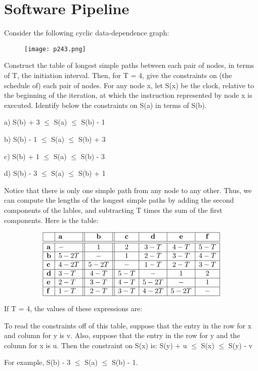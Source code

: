 \newpage
\section{Software Pipeline}





\begin{problem}

Consider the following cyclic data-dependence graph:
\begin{figure}[H]
    \centering
     \texttt{[image: p243.png]}
         \caption{}
         \label{fig:p243}
\end{figure}

Construct the table of longest simple paths between each pair of nodes, in terms of T, the initiation interval. Then, for T = 4, give the constraints on (the schedule of) each pair of nodes. For any node x, let S(x) be the clock, relative to the beginning of the iteration, at which the instruction represented by node x is executed. Identify below the constraints on S(a) in terms of S(b).

 
 	\item a) 	S(b) + 3 $\leq$ S(a) $\leq$ S(b) - 1
 	\item b) 	S(b) - 1 $\leq$ S(a) $\leq$ S(b) + 3
 	\item c) 	S(b) + 1 $\leq$ S(a) $\leq$ S(b) - 3
 	\item d) 	S(b) - 3 $\leq$ S(a) $\leq$ S(b) + 1


{\color{red}Notice that there is only one simple path from any node to any other. Thus, we can compute the lengths of the longest simple paths by adding the second components of the lables, and subtracting T times the sum of the first components. Here is the table:}

$$
\begin{array}{|l|l||c||c|c|c|c|}
\hline & \mathbf{a} & \mathbf{b} & \mathbf{c} & \mathbf{d} & \mathbf{e} & \mathbf{f} \\
\hline \hline \mathbf{a} & - & 1 & 2 & 3-T & 4-T & 5-T \\
\hline \mathbf{b} & 5-2 T & - & 1 & 2-T & 3-T & 4-T \\
\hline \mathbf{c} & 4-2 T & 5-2 T & - & 1-T & 2-T & 3-T \\
\hline \mathbf{d} & 3-T & 4-T & 5-T & - & 1 & 2 \\
\hline \mathbf{e} & 2-T & 3-T & 4-T & 5-2 T & - & 1 \\
\hline \mathbf{f} & 1-T & 2-T & 3-T & 4-2 T & 5-2 T & - \\
\hline
\end{array}
$$

{\color{red}If T = 4, the values of these expressions are:

To read the constraints off of this table, suppose that the entry in the row for x and column for y is v. Also, suppose that the entry in the row for y and the column for x is u. Then the constraint on S(x) is:
S(y) + u $\leq$ S(x) $\leq$ S(y) - v

For example, S(b) - 3 $\leq$ S(a) $\leq$ S(b) - 1.}



\end{problem}
